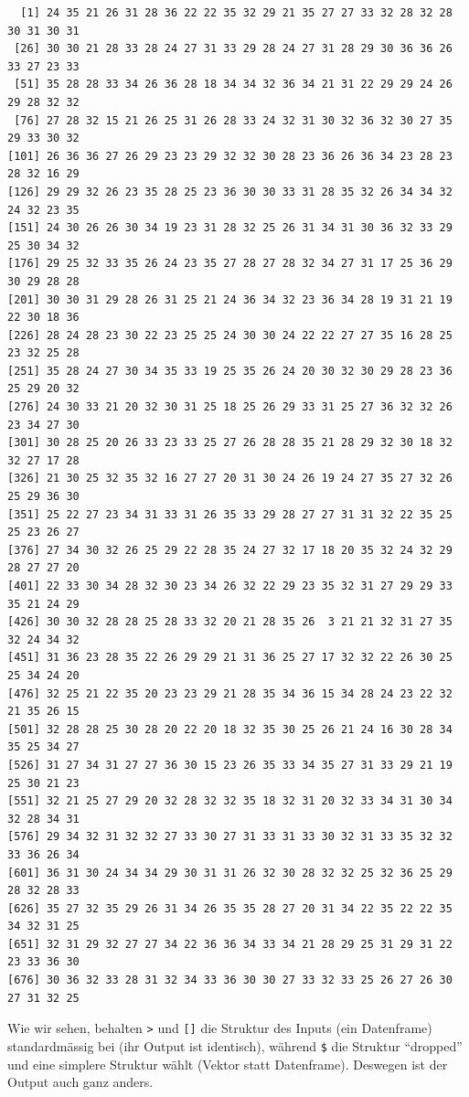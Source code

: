 \documentclass[
  letterpaper,
  DIV=11,
  numbers=noendperiod]{scrreprt}
\begin{document}
\begin{verbatim}
  [1] 24 35 21 26 31 28 36 22 22 35 32 29 21 35 27 27 33 32 28 32 28 30 31 30 31
 [26] 30 30 21 28 33 28 24 27 31 33 29 28 24 27 31 28 29 30 36 36 26 33 27 23 33
 [51] 35 28 28 33 34 26 36 28 18 34 34 32 36 34 21 31 22 29 29 24 26 29 28 32 32
 [76] 27 28 32 15 21 26 25 31 26 28 33 24 32 31 30 32 36 32 30 27 35 29 33 30 32
[101] 26 36 36 27 26 29 23 23 29 32 32 30 28 23 36 26 36 34 23 28 23 28 32 16 29
[126] 29 29 32 26 23 35 28 25 23 36 30 30 33 31 28 35 32 26 34 34 32 24 32 23 35
[151] 24 30 26 26 30 34 19 23 31 28 32 25 26 31 34 31 30 36 32 33 29 25 30 34 32
[176] 29 25 32 33 35 26 24 23 35 27 28 27 28 32 34 27 31 17 25 36 29 30 29 28 28
[201] 30 30 31 29 28 26 31 25 21 24 36 34 32 23 36 34 28 19 31 21 19 22 30 18 36
[226] 28 24 28 23 30 22 23 25 25 24 30 30 24 22 22 27 27 35 16 28 25 23 32 25 28
[251] 35 28 24 27 30 34 35 33 19 25 35 26 24 20 30 32 30 29 28 23 36 25 29 20 32
[276] 24 30 33 21 20 32 30 31 25 18 25 26 29 33 31 25 27 36 32 32 26 23 34 27 30
[301] 30 28 25 20 26 33 23 33 25 27 26 28 28 35 21 28 29 32 30 18 32 32 27 17 28
[326] 21 30 25 32 35 32 16 27 27 20 31 30 24 26 19 24 27 35 27 32 26 25 29 36 30
[351] 25 22 27 23 34 31 33 31 26 35 33 29 28 27 27 31 31 32 22 35 25 25 23 26 27
[376] 27 34 30 32 26 25 29 22 28 35 24 27 32 17 18 20 35 32 24 32 29 28 27 27 20
[401] 22 33 30 34 28 32 30 23 34 26 32 22 29 23 35 32 31 27 29 29 33 35 21 24 29
[426] 30 30 32 28 28 25 28 33 32 20 21 28 35 26  3 21 21 32 31 27 35 32 24 34 32
[451] 31 36 23 28 35 22 26 29 29 21 31 36 25 27 17 32 32 22 26 30 25 25 34 24 20
[476] 32 25 21 22 35 20 23 23 29 21 28 35 34 36 15 34 28 24 23 22 32 21 35 26 15
[501] 32 28 28 25 30 28 20 22 20 18 32 35 30 25 26 21 24 16 30 28 34 35 25 34 27
[526] 31 27 34 31 27 27 36 30 15 23 26 35 33 34 35 27 31 33 29 21 19 25 30 21 23
[551] 32 21 25 27 29 20 32 28 32 32 35 18 32 31 20 32 33 34 31 30 34 32 28 34 31
[576] 29 34 32 31 32 32 27 33 30 27 31 33 31 33 30 32 31 33 35 32 32 33 36 26 34
[601] 36 31 30 24 34 34 29 30 31 31 26 32 30 28 32 32 25 32 36 25 29 28 32 28 33
[626] 35 27 32 35 29 26 31 34 26 35 35 28 27 20 31 34 22 35 22 22 35 34 32 31 25
[651] 32 31 29 32 27 27 34 22 36 36 34 33 34 21 28 29 25 31 29 31 22 23 33 36 30
[676] 30 36 32 33 28 31 32 34 33 36 30 30 27 33 32 33 25 26 27 26 30 27 31 32 25
\end{verbatim}

Wie wir sehen, behalten \texttt{\textbar{}\textgreater{}} und
\texttt{{[}{]}} die Struktur des Inputs (ein Datenframe) standardmässig
bei (ihr Output ist identisch), während \texttt{\$} die Struktur
``dropped'' und eine simplere Struktur wählt (Vektor statt Datenframe).
Deswegen ist der Output auch ganz anders.
\end{document}
